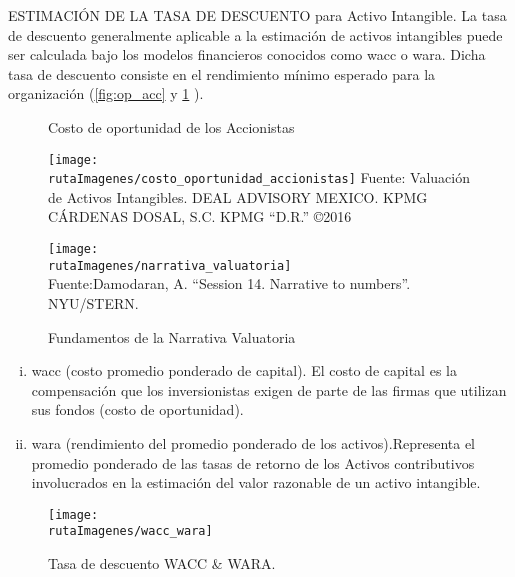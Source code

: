\textcolor{secundario}{ESTIMACI\'ON DE LA TASA DE DESCUENTO para Activo Intangible}. La tasa de descuento generalmente aplicable a la estimaci\'on de activos intangibles puede ser calculada bajo los modelos financieros conocidos como  \gls{wacc} o \gls{wara}. Dicha tasa de descuento consiste en el rendimiento m\'inimo esperado para la organizaci\'on (\autoref{fig:op_acc} y \ref{fig:narr_val} ).

\begin{center}
\begin{figure}[H]
\begin{minipage}{8cm}
\centering
\caption{Costo de oportunidad de los Accionistas\label{fig:op_acc}}
\texttt{[image: \\rutaImagenes/costo\_oportunidad\_accionistas]}
\footnotesize{Fuente: Valuaci\'on de Activos Intangibles. DEAL ADVISORY MEXICO. KPMG C\'ARDENAS DOSAL, S.C. KPMG ``D.R.'' \copyright 2016}
\end{minipage}
\quad
\begin{minipage}{8cm}
\caption{Fundamentos de la Narrativa Valuatoria\label{fig:narr_val}}
\texttt{[image: \\rutaImagenes/narrativa\_valuatoria]}\\
\footnotesize{Fuente:Damodaran, A. ``Session 14. Narrative to numbers''. NYU/STERN.}

\end{minipage}

\end{figure}
\end{center}

\begin{enumerate}[i)]
\item \textcolor{secundario}{\gls{wacc} (costo promedio ponderado de capital).} El costo de capital es la compensaci\'on que los inversionistas exigen de parte de las firmas que utilizan sus fondos (costo de oportunidad).
\item \textcolor{secundario}{\gls{wara} (rendimiento del promedio ponderado de los activos).}Representa el promedio ponderado de las tasas de retorno de los Activos contributivos involucrados en la estimaci\'on del  valor razonable de un activo intangible.
\end{enumerate}

\begin{figure}[H]
\centering
\caption{Tasa de descuento WACC \& WARA.\label{fig:wacc_wara}}
\texttt{[image: \\rutaImagenes/wacc\_wara]}
\end{figure}